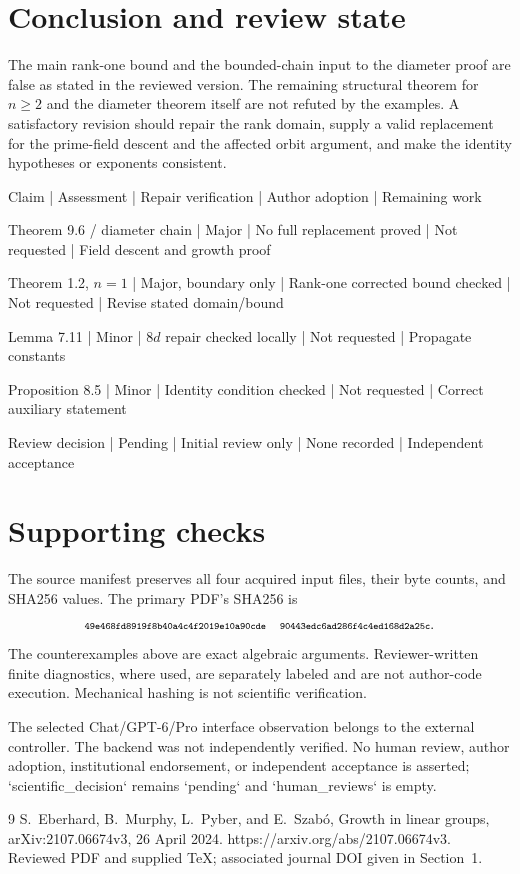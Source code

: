 \documentclass[10pt]{article}
\begin{document}
\section*{Conclusion and review state}
The main rank-one bound and the bounded-chain input to the diameter proof are false as stated in the reviewed version. The remaining structural theorem for \(n\ge2\) and the diameter theorem itself are not refuted by the examples. A satisfactory revision should repair the rank domain, supply a valid replacement for the prime-field descent and the affected orbit argument, and make the identity hypotheses or exponents consistent.\par
Claim | Assessment | Repair verification | Author adoption | Remaining work\par
Theorem 9.6 / diameter chain | Major | No full replacement proved | Not requested | Field descent and growth proof\par
Theorem 1.2, \(n=1\) | Major, boundary only | Rank-one corrected bound checked | Not requested | Revise stated domain/bound\par
Lemma 7.11 | Minor | \(8d\) repair checked locally | Not requested | Propagate constants\par
Proposition 8.5 | Minor | Identity condition checked | Not requested | Correct auxiliary statement\par
Review decision | Pending | Initial review only | None recorded | Independent acceptance\par
\section*{Supporting checks}
The source manifest preserves all four acquired input files, their byte counts, and SHA256 values. The primary PDF’s SHA256 is \[\text{\texttt{\scriptsize 49e468fd8919f8b40a4c4f2019e10a90cde}}
\quad
\text{\texttt{\scriptsize 90443edc6ad286f4c4ed168d2a25c}}.\] The counterexamples above are exact algebraic arguments. Reviewer-written finite diagnostics, where used, are separately labeled and are not author-code execution. Mechanical hashing is not scientific verification.\par
The selected Chat/GPT-6/Pro interface observation belongs to the external controller. The backend was not independently verified. No human review, author adoption, institutional endorsement, or independent acceptance is asserted; `scientific\_decision` remains `pending` and `human\_reviews` is empty.\par
9 S. Eberhard, B. Murphy, L. Pyber, and E. Szabó, Growth in linear groups, arXiv:2107.06674v3, 26 April 2024. https://arxiv.org/abs/2107.06674v3. Reviewed PDF and supplied TeX; associated journal DOI given in Section 1.\par
\end{document}
